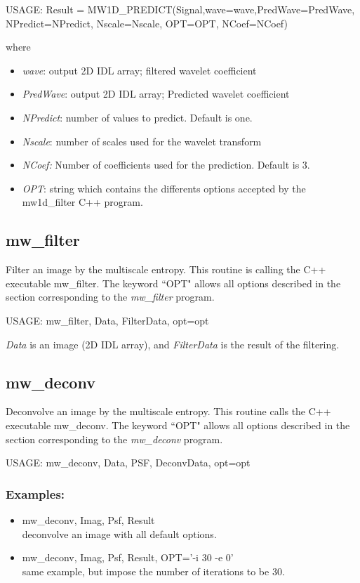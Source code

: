 {\bf
\begin{center}
     USAGE: Result = MW1D\_PREDICT(Signal,wave=wave,PredWave=PredWave,
                      NPredict=NPredict, Nscale=Nscale,  OPT=OPT, NCoef=NCoef)
\end{center}}
where 
\begin{itemize}
\item {\em wave}: output 2D IDL array; filtered wavelet coefficient
\item {\em PredWave}: output 2D IDL array; Predicted wavelet coefficient
\item {\em NPredict}: number of values to predict. Default is one.
\item {\em Nscale}: number of scales used for the wavelet transform
\item {\em NCoef:} Number of coefficients used for the prediction. Default is 3.
\item {\em OPT}: string which contains the differents options accepted by the
mw1d\_filter C++ program.
\end{itemize}

\subsection{mw\_filter}
Filter  an image by the multiscale entropy. 
This routine is calling the C++ executable {mw\_filter}. The keyword 
``OPT" allows 
all options described in the section corresponding to the 
 {\em mw\_filter} program.

{\bf
\begin{center}
     USAGE: mw\_filter, Data, FilterData, opt=opt
\end{center}}
{\em Data} is an image (2D IDL array), and {\em FilterData} is the result
of the filtering.

\subsection{mw\_deconv}
Deconvolve an image by  the  multiscale entropy. This routine calls 
the C++ executable {mw\_deconv}. The keyword ``OPT" 
allows 
all options described in the section corresponding to the 
 {\em mw\_deconv} program.

{\bf
\begin{center}
     USAGE: mw\_deconv, Data, PSF, DeconvData, opt=opt
\end{center}}
\subsubsection*{Examples:} 
\begin{itemize}
\item mw\_deconv, Imag, Psf, Result \\
deconvolve an image with all default options.
\item  mw\_deconv, Imag, Psf, Result, OPT='-i 30 -e 0'  \\
same example, but impose the number of iterations to be 30.
\end{itemize}

 
